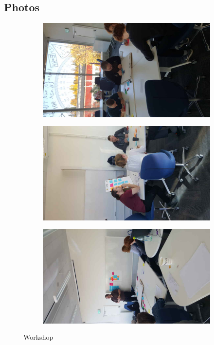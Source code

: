 \subsection*{Photos}
\begin{figure}[hb]
\centering
    \begin{subfigure}{.32\textwidth}
        \centering
        \includegraphics[width=\textwidth, angle=270, origin=c]{img/workshop1_resized.jpg}
        \label{fig:workshop1}
    \end{subfigure}
    \begin{subfigure}{.32\textwidth}
        \centering
        \includegraphics[width=\textwidth, angle=270, origin=c]{img/workshop2_resized.jpg}
        \label{fig:workshop2}
    \end{subfigure}
    \begin{subfigure}{.32\textwidth}
        \centering
        \includegraphics[width=\textwidth, angle=270, origin=c]{img/workshop3_resized.jpg}
        \label{fig:workshop3}
    \end{subfigure}
    \caption{Workshop}
\end{figure}
\vfill

